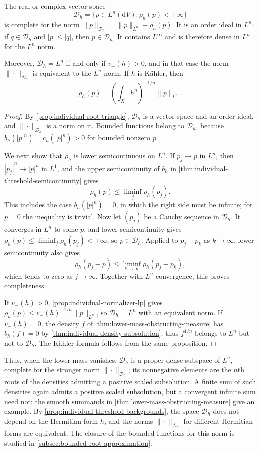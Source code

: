 \begin{proposition}\label{prop:individual-density-banach}
The real or complex vector space
\[
 \mathcal D_h=\{p\in L^n(\mathrm{d}V):\rho_h(p)<+\infty\}
\]
is complete for the norm $\|p\|_{\mathcal D_h}=\|p\|_{L^n}+\rho_h(p)$. It is an order ideal in $L^n$: if $q\in\mathcal D_h$ and $|p|\leq|q|$, then $p\in\mathcal D_h$. It contains $L^\infty$ and is therefore dense in $L^n$ for the $L^n$ norm.

Moreover, $\mathcal D_h=L^n$ if and only if $v_-(h)>0$, and in that case the norm $\|\cdot\|_{\mathcal D_h}$ is equivalent to the $L^n$ norm. If $h$ is K\"ahler, then
\[
 \rho_h(p)=\left(\int_Xh^n\right)^{-1/n}\|p\|_{L^n}.
\]
\end{proposition}
\begin{proof}
By \cref{prop:individual-root-triangle}, $\mathcal D_h$ is a vector space and an order ideal, and $\|\cdot\|_{\mathcal D_h}$ is a norm on it. Bounded functions belong to $\mathcal D_h$, because $b_h(|p|^n)=c_h(|p|^n)>0$ for bounded nonzero $p$.

We next show that $\rho_h$ is lower semicontinuous on $L^n$. If $p_j\to p$ in $L^n$, then $|p_j|^n\to|p|^n$ in $L^1$, and the upper semicontinuity of $b_h$ in \cref{thm:individual-threshold-semicontinuity} gives
\[
 \rho_h(p)\leq\liminf_j\rho_h(p_j).
\]
This includes the case $b_h(|p|^n)=0$, in which the right side must be infinite; for $p=0$ the inequality is trivial. Now let $(p_j)$ be a Cauchy sequence in $\mathcal D_h$. It converges in $L^n$ to some $p$, and lower semicontinuity gives $\rho_h(p)\leq\liminf_j\rho_h(p_j)<+\infty$, so $p\in\mathcal D_h$. Applied to $p_j-p_k$ as $k\to\infty$, lower semicontinuity also gives
\[
 \rho_h(p_j-p)\leq\liminf_{k\to\infty}\rho_h(p_j-p_k),
\]
which tends to zero as $j\to\infty$. Together with $L^n$ convergence, this proves completeness.

If $v_-(h)>0$, \cref{prop:individual-normalizer-lp} gives
$\rho_h(p)\leq v_-(h)^{-1/n}\|p\|_{L^n}$, so $\mathcal D_h=L^n$ with an equivalent norm. If $v_-(h)=0$, the density $f$ of \cref{thm:lower-mass-obstructing-measure} has $b_h(f)=0$ by \cref{thm:individual-density-subsolution}; thus $f^{1/n}$ belongs to $L^n$ but not to $\mathcal D_h$. The K\"ahler formula follows from the same proposition.
\end{proof}

Thus, when the lower mass vanishes, $\mathcal D_h$ is a proper dense subspace of $L^n$, complete for the stronger norm $\|\cdot\|_{\mathcal D_h}$; its nonnegative elements are the $n$th roots of the densities admitting a positive scaled subsolution. A finite sum of such densities again admits a positive scaled subsolution, but a convergent infinite sum need not: the smooth summands in \cref{thm:lower-mass-obstructing-measure} give an example. By \cref{prop:individual-threshold-backgrounds}, the space $\mathcal D_h$ does not depend on the Hermitian form $h$, and the norms $\|\cdot\|_{\mathcal D_h}$ for different Hermitian forms are equivalent. The closure of the bounded functions for this norm is studied in \cref{subsec:bounded-root-approximation}.

